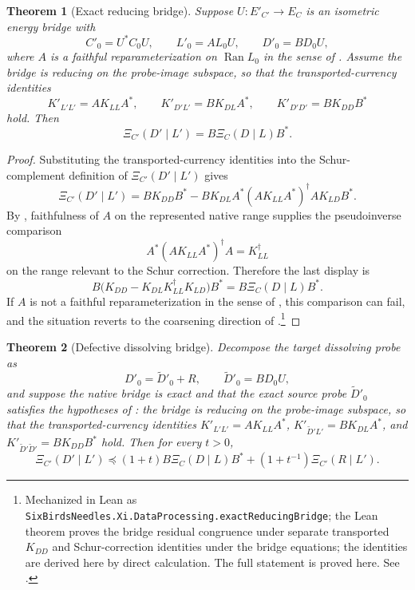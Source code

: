 \documentclass[11pt]{article}
\DeclareMathOperator{\Ran}{Ran}
\newcommand{\preceqq}{\preceq}
\newtheorem{theorem}{Theorem}[section]
\theoremstyle{definition}
\begin{document}
\begin{theorem}[Exact reducing bridge]\label{thm:xi:exact-reducing-bridge}
Suppose \(U\colon E'_{C'}\to E_C\) is an isometric energy bridge with
\[
  C'_0=U^*C_0U,
  \qquad
  L'_0=AL_0U,
  \qquad
  D'_0=BD_0U,
\]
where \(A\) is a faithful reparameterization on \(\Ran L_0\) in the
sense of .  Assume the
bridge is reducing on the probe-image subspace, so that the
transported-currency identities
\[
  K'_{L'L'}=AK_{LL}A^*,
  \qquad
  K'_{D'L'}=BK_{DL}A^*,
  \qquad
  K'_{D'D'}=BK_{DD}B^*
\]
hold.  Then
\[
  \boxed{\Xi_{C'}(D'\mid L')=B\Xi_C(D\mid L)B^*.}
\]
\end{theorem}

\begin{proof}
Substituting the transported-currency identities into the Schur-complement
definition of \(\Xi_{C'}(D'\mid L')\) gives
\[
  \Xi_{C'}(D'\mid L')
  =
  BK_{DD}B^*
  -
  BK_{DL}A^*(AK_{LL}A^*)^\dagger AK_{LD}B^*.
\]
By , faithfulness of
\(A\) on the represented native range supplies the
pseudoinverse comparison
\[
  A^*(AK_{LL}A^*)^\dagger A=K_{LL}^\dagger
\]
on the range relevant to the Schur correction.  Therefore the last display is
\[
  B\bigl(K_{DD}-K_{DL}K_{LL}^\dagger K_{LD}\bigr)B^*
  =
  B\Xi_C(D\mid L)B^*.
\]
If \(A\) is not a faithful reparameterization in the sense of
, this comparison can fail,
and the situation reverts to the coarsening direction of
.\footnote{Mechanized in Lean as \texttt{SixBirdsNeedles.Xi.DataProcessing.exactReducingBridge}; the Lean theorem proves the bridge residual congruence under separate transported \(K_{DD}\) and Schur-correction identities under the bridge equations; the identities are derived here by direct calculation.  The full statement is proved here.  See .}
\end{proof}

\begin{theorem}[Defective dissolving bridge]\label{thm:xi:defective-bridge}
Decompose the target dissolving probe as
\[
  D'_0 = \widetilde D'_0 + R,
  \qquad
  \widetilde D'_0 = BD_0U,
\]
and suppose the native bridge is exact and that the exact source
probe \(\widetilde D'_0\) satisfies the hypotheses of
: the bridge is reducing on
the probe-image subspace, so that the transported-currency
identities \(K'_{L'L'}=AK_{LL}A^*\),
\(K'_{\widetilde D' L'}=BK_{DL}A^*\), and
\(K'_{\widetilde D' \widetilde D'}=BK_{DD}B^*\) hold.  Then for
every \(t>0\),
\[
  \boxed{
  \Xi_{C'}(D'\mid L')
  \preceqq
  (1+t)B\Xi_C(D\mid L)B^*
  +(1+t^{-1})\Xi_{C'}(R\mid L').}
\]
\end{theorem}
\end{document}
